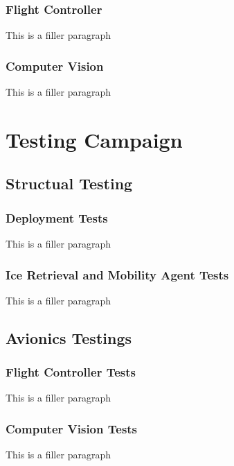 		\subsubsection{Flight Controller}
			This is a filler paragraph

		\subsubsection{Computer Vision}
			This is a filler paragraph

\section{Testing Campaign}\label{PL:Deployment:Testing}
	\subsection{Structual Testing}
		\subsubsection{Deployment Tests}
			This is a filler paragraph

		\subsubsection{Ice Retrieval and Mobility Agent Tests}
			This is a filler paragraph

	\subsection{Avionics Testings}
		\subsubsection{Flight Controller Tests}
			This is a filler paragraph

		\subsubsection{Computer Vision Tests}
			This is a filler paragraph





